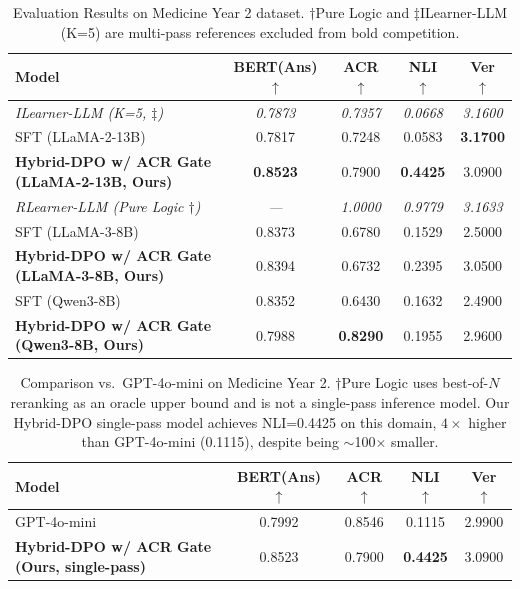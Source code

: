 \begin{table}[h]
\centering
\small
\begin{tabular}{l|c|c|c|c}
\toprule
Model & BERT(Ans) $\uparrow$ & ACR $\uparrow$ & NLI $\uparrow$ & Ver $\uparrow$ \\
\midrule
\textit{ILearner-LLM (K=5, $\ddagger$)} & \textit{0.7873} & \textit{0.7357} & \textit{0.0668} & \textit{3.1600} \\
\midrule
SFT (LLaMA-2-13B) & 0.7817 & 0.7248 & 0.0583 & \textbf{3.1700} \\
\textbf{Hybrid-DPO w/ ACR Gate (LLaMA-2-13B, Ours)} & \textbf{0.8523} & 0.7900 & \textbf{0.4425} & 3.0900 \\
\textit{RLearner-LLM (Pure Logic $\dagger$)} & \textit{---} & \textit{1.0000} & \textit{0.9779} & \textit{3.1633} \\
\midrule
SFT (LLaMA-3-8B) & 0.8373 & 0.6780 & 0.1529 & 2.5000 \\
\textbf{Hybrid-DPO w/ ACR Gate (LLaMA-3-8B, Ours)} & 0.8394 & 0.6732 & 0.2395 & 3.0500 \\
\midrule
SFT (Qwen3-8B) & 0.8352 & 0.6430 & 0.1632 & 2.4900 \\
\textbf{Hybrid-DPO w/ ACR Gate (Qwen3-8B, Ours)} & 0.7988 & \textbf{0.8290} & 0.1955 & 2.9600 \\
\bottomrule
\end{tabular}
\caption{Evaluation Results on Medicine Year 2 dataset. $\dagger$Pure Logic and $\ddagger$ILearner-LLM (K=5) are multi-pass references excluded from bold competition.}
\label{tab:med_results_2}
\end{table}

\begin{table}[h]
\centering
\small
\begin{tabular}{l|c|c|c|c}
\toprule
Model & BERT(Ans) $\uparrow$ & ACR $\uparrow$ & NLI $\uparrow$ & Ver $\uparrow$ \\
\midrule
GPT-4o-mini & 0.7992 & 0.8546 & 0.1115 & 2.9900 \\
\textbf{Hybrid-DPO w/ ACR Gate (Ours, single-pass)} & 0.8523 & 0.7900 & \textbf{0.4425} & 3.0900 \\
\bottomrule
\end{tabular}
\caption{Comparison vs.\ GPT-4o-mini on Medicine Year 2. $\dagger$Pure Logic uses best-of-$N$ reranking as an oracle upper bound and is not a single-pass inference model. Our Hybrid-DPO single-pass model achieves NLI=0.4425 on this domain, $4\times$ higher than GPT-4o-mini (0.1115), despite being $\sim$100$\times$ smaller.}
\label{tab:gpt_results}
\end{table}

